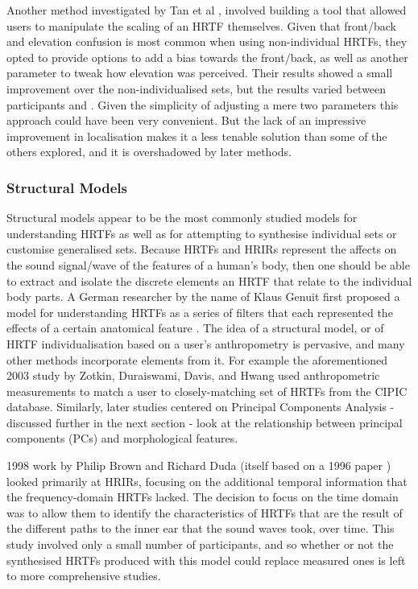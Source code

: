 Another method investigated by Tan et al \citep{Tan1998}, involved building a tool that allowed users to manipulate the scaling of an HRTF themselves. Given that front/back and elevation confusion is most common when using non-individual HRTFs, they opted to provide options to add a bias towards the front/back, as well as another parameter to tweak how elevation was perceived. Their results showed a small improvement over the non-individualised sets, but the results varied between participants and . Given the simplicity of adjusting a mere two parameters this approach could have been very convenient. But the lack of an impressive improvement in localisation makes it a less tenable solution than some of the others explored, and it is overshadowed by later methods. 

\subsubsection{Structural Models}
Structural models appear to be the most commonly studied models for understanding HRTFs as well as for attempting to synthesise individual sets or customise generalised sets\citep{seminal paper}.  Because HRTFs and HRIRs represent the affects on the sound signal/wave of the features of a human's body, then one should be able to extract and isolate the discrete elements an HRTF that relate to the individual body parts. A German researcher by the name of Klaus Genuit first proposed a model for understanding HRTFs as a series of filters that each represented the effects of a certain anatomical feature \citep{Genuit1984}. The idea of a structural model, or of HRTF individualisation based on a user's anthropometry is pervasive, and many other methods incorporate elements from it. For example the aforementioned 2003 study by Zotkin, Duraiswami, Davis, and Hwang  \citep{Duraiswami2003} used anthropometric measurements to match a user to closely-matching set of HRTFs from the CIPIC database. Similarly, later studies centered on Principal Components Analysis - discussed further in the next section - look at the relationship between principal components (PCs) and morphological features. 

1998 work by Philip Brown and Richard Duda \citep{PhillipBrown1998} (itself based on a 1996 paper \citep{lopexmeddis1996}) looked primarily at HRIRs, focusing on the additional temporal information that the frequency-domain HRTFs lacked. The decision to focus on the time domain was to allow them to identify the characteristics of HRTFs that are the result of the different paths to the inner ear that the sound waves took, over time. This study involved only a small number of participants, and so whether or not the synthesised HRTFs produced with this model could replace measured ones is left to more comprehensive studies. 

